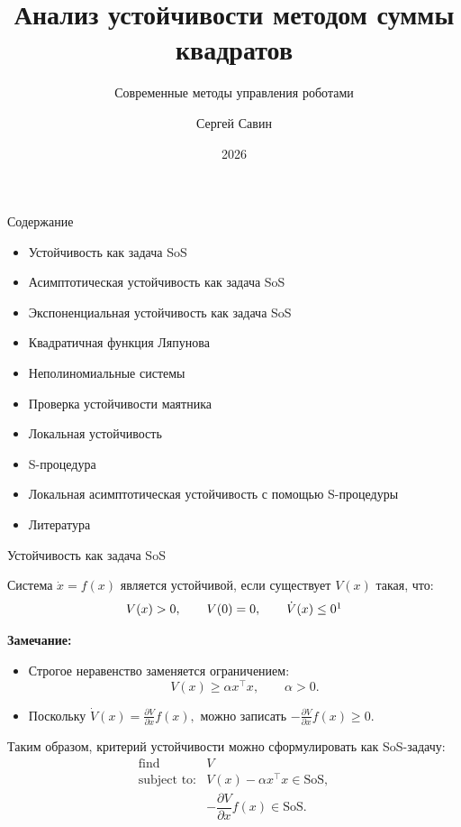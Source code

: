 \documentclass{beamer}
\subtitle{Современные методы управления роботами}
\author{Сергей Савин}
\date{2026}
\title{Анализ устойчивости методом суммы квадратов}
\begin{document}
\maketitle

\begin{frame}{Содержание}
	\begin{itemize}
		\item Устойчивость как задача SoS
		\item Асимптотическая устойчивость как задача SoS
		\item Экспоненциальная устойчивость как задача SoS
		\item Квадратичная функция Ляпунова
		\item Неполиномиальные системы
		\item Проверка устойчивости маятника
		\item Локальная устойчивость
		\item S-процедура
		\item Локальная асимптотическая устойчивость с помощью S-процедуры
		\item Литература
	\end{itemize}
\end{frame}

\begin{frame}{Устойчивость как задача SoS}
	\begin{flushleft}
		Система $\dot{x}=f(x)$ является устойчивой, если существует $V(x)$ такая, что:
		\[
		V(x)>0,\qquad V(0)=0,\qquad \dot V(x)\leq0\footnotemark
		\]
		
		\textbf{Замечание:}
		\begin{itemize}
			\item Строгое неравенство заменяется ограничением:
			\[
			V(x)\geq\alpha x^\top x,\qquad \alpha>0.
			\]
			
			\item Поскольку $\dot V(x)
			=
			\frac{\partial V}{\partial x}f(x),$	можно записать $-\frac{\partial V}{\partial x}f(x)\geq0$.
		\end{itemize}
		
		Таким образом, критерий устойчивости можно сформулировать как SoS-задачу:
		\[
		\begin{array}{ll}
			\text{find} & V\\[0.2em]
			\text{subject to:} &
			V(x)-\alpha x^\top x\in\mathrm{SoS},\\
			&
			-\dfrac{\partial V}{\partial x}f(x)\in\mathrm{SoS}.
		\end{array}
		\]
	\end{flushleft}
	
\end{frame}
\end{document}
